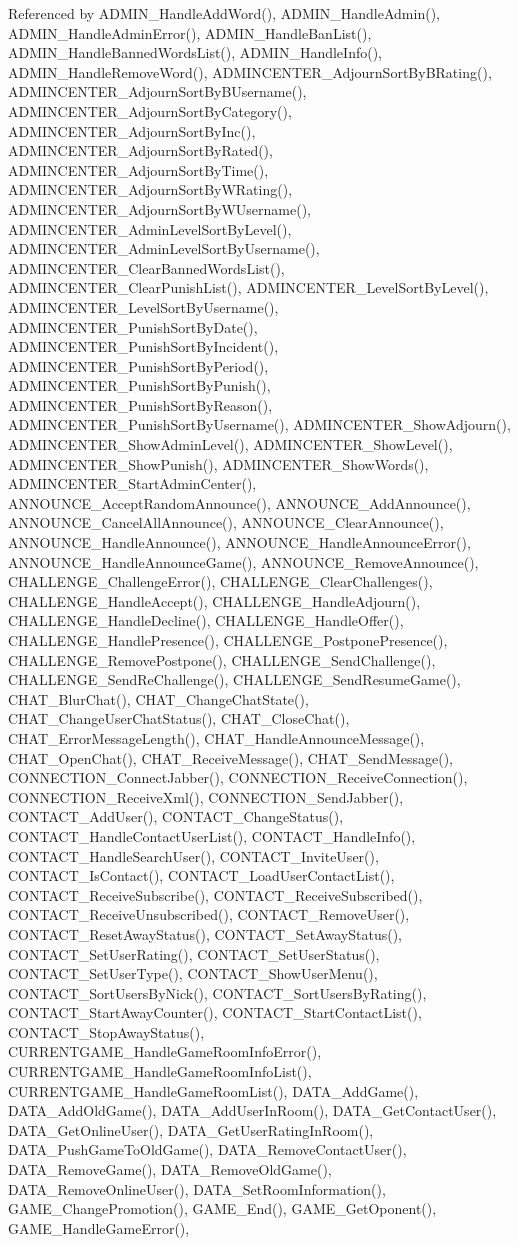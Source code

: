 Referenced by ADMIN\_\-HandleAddWord(), ADMIN\_\-HandleAdmin(), ADMIN\_\-HandleAdminError(), ADMIN\_\-HandleBanList(), ADMIN\_\-HandleBannedWordsList(), ADMIN\_\-HandleInfo(), ADMIN\_\-HandleRemoveWord(), ADMINCENTER\_\-AdjournSortByBRating(), ADMINCENTER\_\-AdjournSortByBUsername(), ADMINCENTER\_\-AdjournSortByCategory(), ADMINCENTER\_\-AdjournSortByInc(), ADMINCENTER\_\-AdjournSortByRated(), ADMINCENTER\_\-AdjournSortByTime(), ADMINCENTER\_\-AdjournSortByWRating(), ADMINCENTER\_\-AdjournSortByWUsername(), ADMINCENTER\_\-AdminLevelSortByLevel(), ADMINCENTER\_\-AdminLevelSortByUsername(), ADMINCENTER\_\-ClearBannedWordsList(), ADMINCENTER\_\-ClearPunishList(), ADMINCENTER\_\-LevelSortByLevel(), ADMINCENTER\_\-LevelSortByUsername(), ADMINCENTER\_\-PunishSortByDate(), ADMINCENTER\_\-PunishSortByIncident(), ADMINCENTER\_\-PunishSortByPeriod(), ADMINCENTER\_\-PunishSortByPunish(), ADMINCENTER\_\-PunishSortByReason(), ADMINCENTER\_\-PunishSortByUsername(), ADMINCENTER\_\-ShowAdjourn(), ADMINCENTER\_\-ShowAdminLevel(), ADMINCENTER\_\-ShowLevel(), ADMINCENTER\_\-ShowPunish(), ADMINCENTER\_\-ShowWords(), ADMINCENTER\_\-StartAdminCenter(), ANNOUNCE\_\-AcceptRandomAnnounce(), ANNOUNCE\_\-AddAnnounce(), ANNOUNCE\_\-CancelAllAnnounce(), ANNOUNCE\_\-ClearAnnounce(), ANNOUNCE\_\-HandleAnnounce(), ANNOUNCE\_\-HandleAnnounceError(), ANNOUNCE\_\-HandleAnnounceGame(), ANNOUNCE\_\-RemoveAnnounce(), CHALLENGE\_\-ChallengeError(), CHALLENGE\_\-ClearChallenges(), CHALLENGE\_\-HandleAccept(), CHALLENGE\_\-HandleAdjourn(), CHALLENGE\_\-HandleDecline(), CHALLENGE\_\-HandleOffer(), CHALLENGE\_\-HandlePresence(), CHALLENGE\_\-PostponePresence(), CHALLENGE\_\-RemovePostpone(), CHALLENGE\_\-SendChallenge(), CHALLENGE\_\-SendReChallenge(), CHALLENGE\_\-SendResumeGame(), CHAT\_\-BlurChat(), CHAT\_\-ChangeChatState(), CHAT\_\-ChangeUserChatStatus(), CHAT\_\-CloseChat(), CHAT\_\-ErrorMessageLength(), CHAT\_\-HandleAnnounceMessage(), CHAT\_\-OpenChat(), CHAT\_\-ReceiveMessage(), CHAT\_\-SendMessage(), CONNECTION\_\-ConnectJabber(), CONNECTION\_\-ReceiveConnection(), CONNECTION\_\-ReceiveXml(), CONNECTION\_\-SendJabber(), CONTACT\_\-AddUser(), CONTACT\_\-ChangeStatus(), CONTACT\_\-HandleContactUserList(), CONTACT\_\-HandleInfo(), CONTACT\_\-HandleSearchUser(), CONTACT\_\-InviteUser(), CONTACT\_\-IsContact(), CONTACT\_\-LoadUserContactList(), CONTACT\_\-ReceiveSubscribe(), CONTACT\_\-ReceiveSubscribed(), CONTACT\_\-ReceiveUnsubscribed(), CONTACT\_\-RemoveUser(), CONTACT\_\-ResetAwayStatus(), CONTACT\_\-SetAwayStatus(), CONTACT\_\-SetUserRating(), CONTACT\_\-SetUserStatus(), CONTACT\_\-SetUserType(), CONTACT\_\-ShowUserMenu(), CONTACT\_\-SortUsersByNick(), CONTACT\_\-SortUsersByRating(), CONTACT\_\-StartAwayCounter(), CONTACT\_\-StartContactList(), CONTACT\_\-StopAwayStatus(), CURRENTGAME\_\-HandleGameRoomInfoError(), CURRENTGAME\_\-HandleGameRoomInfoList(), CURRENTGAME\_\-HandleGameRoomList(), DATA\_\-AddGame(), DATA\_\-AddOldGame(), DATA\_\-AddUserInRoom(), DATA\_\-GetContactUser(), DATA\_\-GetOnlineUser(), DATA\_\-GetUserRatingInRoom(), DATA\_\-PushGameToOldGame(), DATA\_\-RemoveContactUser(), DATA\_\-RemoveGame(), DATA\_\-RemoveOldGame(), DATA\_\-RemoveOnlineUser(), DATA\_\-SetRoomInformation(), GAME\_\-ChangePromotion(), GAME\_\-End(), GAME\_\-GetOponent(), GAME\_\-HandleGameError(), 